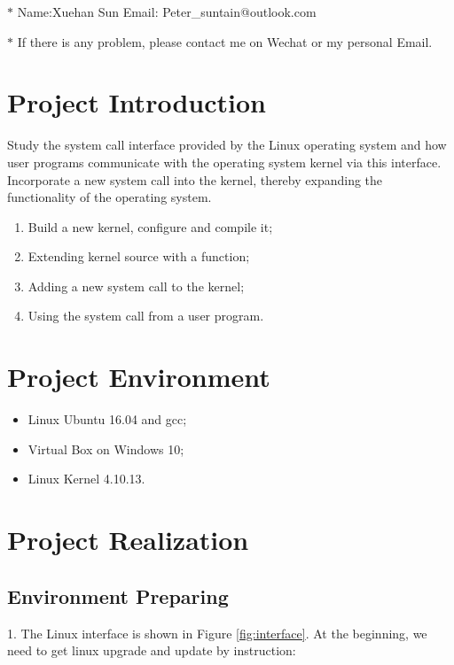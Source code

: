 \documentclass[12pt,a4paper]{article}
\begin{document}
\noindent{}
\begin{center}

	\footnotesize{\color{blue}$*$ Name:Xuehan Sun \quad \quad Email: Peter\_suntain@outlook.com}

	\footnotesize{\color{red}$*$ If there is any problem, please contact me on Wechat or my personal Email. }
\end{center}

\tableofcontents
\newpage

\section{Project Introduction}
Study the system call interface provided by the Linux operating system and how user programs communicate with the operating system kernel via this interface. Incorporate a new system call into the kernel, thereby expanding the functionality of the operating system.
\begin{enumerate}
	\item  Build a new kernel, configure and compile it;
	\item  Extending kernel source with a function;
	\item  Adding a new system call to the kernel;
	\item  Using the system call from a user program.
\end{enumerate}

\section{Project Environment}
\begin{itemize}
	\item  Linux Ubuntu 16.04 and gcc;
	\item  Virtual Box on Windows 10;
	\item  Linux Kernel 4.10.13.
\end{itemize}

\section{Project Realization}

\subsection{Environment Preparing}
1. The Linux interface is shown in Figure \ref{fig:interface}. At the beginning, we need to get linux upgrade and update by instruction: 
\end{document}
